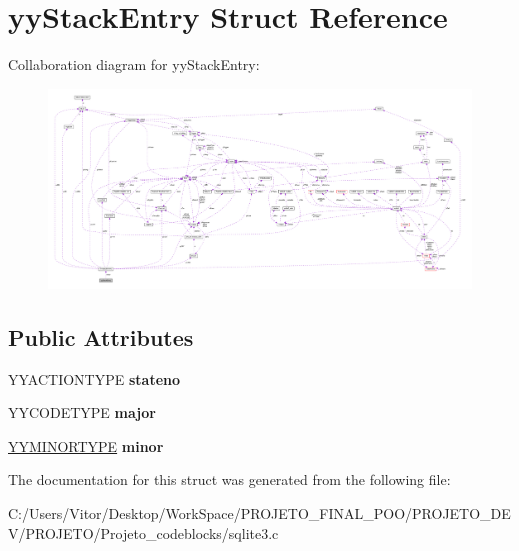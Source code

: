 \hypertarget{structyy_stack_entry}{\section{yy\-Stack\-Entry Struct Reference}
\label{structyy_stack_entry}
}


Collaboration diagram for yy\-Stack\-Entry\-:\nopagebreak
\begin{figure}[H]
\begin{center}
\leavevmode
\includegraphics[width=350pt]{structyy_stack_entry__coll__graph}
\end{center}
\end{figure}
\subsection*{Public Attributes}
\begin{DoxyCompactItemize}
\item 
\hypertarget{structyy_stack_entry_a108164609c2e841577cc3533d8f0180d}{Y\-Y\-A\-C\-T\-I\-O\-N\-T\-Y\-P\-E {\bfseries stateno}}\label{structyy_stack_entry_a108164609c2e841577cc3533d8f0180d}

\item 
\hypertarget{structyy_stack_entry_a7624d02bcf945d48068f4c383551725c}{Y\-Y\-C\-O\-D\-E\-T\-Y\-P\-E {\bfseries major}}\label{structyy_stack_entry_a7624d02bcf945d48068f4c383551725c}

\item 
\hypertarget{structyy_stack_entry_a024e1e64bce5945080629a2dd8d1bb4f}{\hyperlink{union_y_y_m_i_n_o_r_t_y_p_e}{Y\-Y\-M\-I\-N\-O\-R\-T\-Y\-P\-E} {\bfseries minor}}\label{structyy_stack_entry_a024e1e64bce5945080629a2dd8d1bb4f}

\end{DoxyCompactItemize}


The documentation for this struct was generated from the following file\-:\begin{DoxyCompactItemize}
\item 
C\-:/\-Users/\-Vitor/\-Desktop/\-Work\-Space/\-P\-R\-O\-J\-E\-T\-O\-\_\-\-F\-I\-N\-A\-L\-\_\-\-P\-O\-O/\-P\-R\-O\-J\-E\-T\-O\-\_\-\-D\-E\-V/\-P\-R\-O\-J\-E\-T\-O/\-Projeto\-\_\-codeblocks/sqlite3.\-c\end{DoxyCompactItemize}

